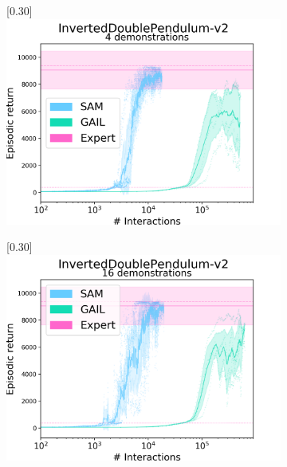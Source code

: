 \begin{figure}
\begin{subfigure}[t]{0.49\textwidth}
    \center\scalebox{0.30}[0.30]{\includegraphics{Plots/sam_gail_InvertedDoublePendulum_s0-1-2-3_d4_results_log}}
  \end{subfigure}
  \begin{subfigure}[t]{0.49\textwidth}
    \center\scalebox{0.30}[0.30]{\includegraphics{Plots/sam_gail_InvertedDoublePendulum_s0-1-2-3_d16_results_log}}
  \end{subfigure}
  \begin{subfigure}[t]{0.49\textwidth}

\end{subfigure}
\end{figure}
